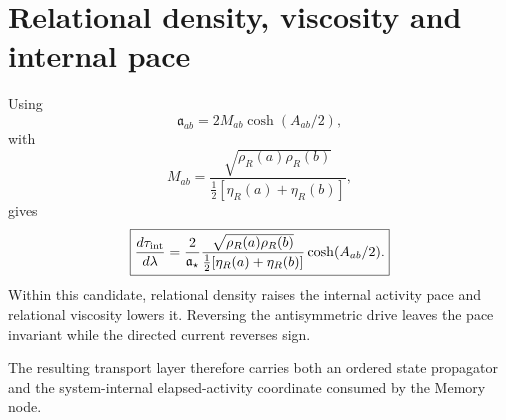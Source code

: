 \section{Relational density, viscosity and internal pace}

Using
\[
\mathfrak a_{ab}
=2M_{ab}\cosh(A_{ab}/2),
\]
with
\[
M_{ab}
=\frac{\sqrt{\rho_R(a)\rho_R(b)}}{\tfrac12[\eta_R(a)+\eta_R(b)]},
\]
gives
\[
\boxed{
\frac{d\tau_{\rm int}}{d\lambda}
=\frac{2}{\mathfrak a_\star}
\frac{\sqrt{\rho_R(a)\rho_R(b)}}{\tfrac12[\eta_R(a)+\eta_R(b)]}
\cosh(A_{ab}/2).
}
\]
Within this candidate, relational density raises the internal activity pace and relational viscosity lowers it. Reversing the antisymmetric drive leaves the pace invariant while the directed current reverses sign.

The resulting transport layer therefore carries both an ordered state propagator and the system-internal elapsed-activity coordinate consumed by the Memory node.

